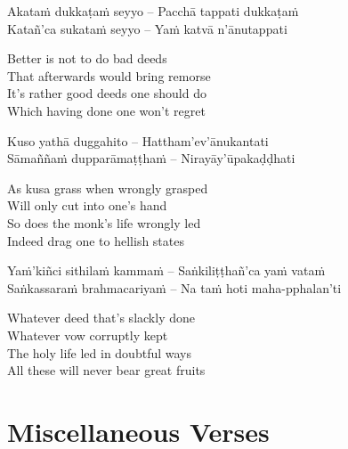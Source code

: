 \begin{verses}
  Akataṁ dukkaṭaṁ seyyo – Pacchā tappati dukkaṭaṁ\\
  Katañ'ca sukataṁ seyyo – Yaṁ katvā n'ānutappati
\end{verses}

\begin{english-verses}
  Better is not to do bad deeds\\
  That afterwards would bring remorse\\
  It's rather good deeds one should do\\
  Which having done one won't regret
\end{english-verses}

\begin{verses}
  Kuso yathā duggahito – Hattham'ev'ānukantati\\
  Sāmaññaṁ dupparāmaṭṭhaṁ – Nirayāy'ūpakaḍḍhati
\end{verses}

\begin{english-verses}
  As kusa grass when wrongly grasped\\
  Will only cut into one's hand\\
  So does the monk's life wrongly led\\
  Indeed drag one to hellish states
\end{english-verses}

\begin{verses}
  Yaṁ'kiñci sithilaṁ kammaṁ – Saṅkiliṭṭhañ'ca yaṁ vataṁ\\
  Saṅkassaraṁ brahmacariyaṁ – Na taṁ hoti maha-pphalan'ti
\end{verses}

\begin{english-verses}
  Whatever deed that's slackly done\\
  Whatever vow corruptly kept\\
  The holy life led in doubtful ways\\
  All these will never bear great fruits
\end{english-verses}

\suttaRef{[SN 2.8]}




\section{Miscellaneous Verses}
\label{misc-verses}

